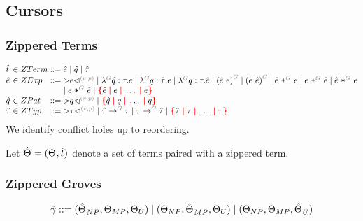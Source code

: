 \subsection{Cursors}


\subsubsection{Zippered Terms}

\[
  \arraycolsep=0pt
  \begin{array}{lcllll}
    \Z{t} & {}\in{} & ZTerm & {}::={} &
      \Z{e}
      \mid \Z{q}
      \mid \Z{\tau}
    \\
    \Z{e} & {}\in{} & ZExp & {}::={} &
      \cursor{v}{p}{e}
      \mid \eFun{G}{\Z{q}}{\tau}{e}
      \mid \eFun{G}{q}{\Z{\tau}}{e}
      \mid \eFun{G}{q}{\tau}{\Z{e}}
      \mid \eApp{G}{\Z{e}}{e}
      \mid \eApp{G}{e}{\Z{e}}
      \mid \ePlus{G}{\Z{e}}{e}
      \mid \ePlus{G}{e}{\Z{e}}
      \mid \eTimes{G}{\Z{e}}{e}
      \\
    &&&&
    \mid \eTimes{G}{e}{\Z{e}}
      \mid \conflictHole{\Z{e}, e, \ldots, e}
    \\
    \Z{q} & {}\in{} & ZPat & {}::={} &
      \cursor{v}{p}{q}
      \mid \conflictHole{\Z{q}, q, \ldots, q}
    \\
    \Z{\tau} & {}\in{} & ZTyp & {}::={} &
      \cursor{v}{p}{\tau}
      \mid \tArrow{G}{\Z{\tau}}{\tau}
      \mid \tArrow{G}{\tau}{\Z{\tau}}
      \mid \conflictHole{\Z{\tau}, \tau, \ldots, \tau}
    \\
  \end{array}
\]
%
We identify conflict holes up to reordering.

Let $\hat{\Theta_{}} = (\Theta_{}, \hat{t})$ denote a set of terms paired with a zippered term.


\subsubsection{Zippered Groves}

\begin{gather*}
  \arraycolsep=0pt
  \begin{array}{lll}
    \Z{\gamma} & {}::={} &
      (\Z{\Set}_{NP}, \Set[MP], \Set[U])
      \mid (\Set[NP], \Z{\Set}_{MP}, \Set[U])
      \mid (\Set[NP], \Set[MP], \Z{\Set}_U)
  \end{array}
\end{gather*}

